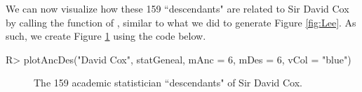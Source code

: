 \documentclass[article,shortnames]{jss}
\begin{document}
We can now visualize how these 159 ``descendants" are related to Sir David Cox by calling the  function of , similar to what we did to generate Figure \ref{fig:Lee}. As such, we create Figure \ref{fig:dCox} using the code below.

\begin{CodeInput}
R> plotAncDes("David Cox", statGeneal, mAnc = 6, mDes = 6, vCol = "blue")
\end{CodeInput}

\begin{figure}%
    \centering
    \caption{The 159 academic statistician ``descendants" of Sir David Cox.}
    \label{fig:dCox}
\end{figure}
\end{document}
